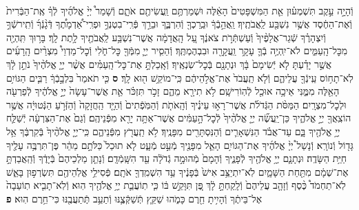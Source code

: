 \documentclass[twoside, openany, parskip=half, 11pt]{book}
\begin{document}
\begin{footnotesize}
\begin{multicols}{2}
\\
וְֿהָיָ֣ה עֵ֣קֶב תִּשְׁמְע֗וּן אֵ֤ת הַמִּשְׁפָּטִים֙ הָאֵ֔לֶּה וּשְׁמַרְתֶּ֥ם וַֽעֲשִׂיתֶ֖ם אֹתָ֑ם וְֿשָׁמַר֩ יְיָ֨ אֱלֹהֶ֜יךָ לְֿךָ֗ אֶֽת־הַבְּֿרִית֙ וְֿאֶת־הַחֶ֔סֶד אֲשֶׁ֥ר נִשְׁבַּ֖ע לַֽאֲבֹתֶֽיךָ׃ וַֽאֲהֵ֣בְֿךָ֔ וּבֵֽרַכְךָ֖ וְֿהִרְבֶּ֑ךָ וּבֵרַ֣ךְ פְּֿרִֽי־בִטְנְךָ֣ וּפְרִֽי־אַ֠דְמָתֶ֠ךָ דְּֿגָ֨נְֿךָ֜ וְֿתִֽירשְֿׁךָ֣ וְֿיִצְהָרֶ֗ךָ שְֿׁגַר־אֲלָפֶ֨יךָ֙ וְֿעַשְׁתְּֿרֹ֣ת צֹאנֶ֔ךָ עַ֚ל הָֽאֲדָמָ֔ה אֲשֶׁר־נִשְׁבַּ֥ע לַֽאֲבֹתֶ֖יךָ לָ֥תֶת לָֽךְ׃ בָּר֥וּךְ תִּֽהְיֶ֖ה מִכׇּל־הָֽעַמִּ֑ים לֹא־יִֽהְיֶ֥ה בְֿךָ֛ עָקָ֥ר וַֽעֲקָרָ֖ה וּבִבְהֶמְתֶּֽךָ׃ וְֿהֵסִ֧יר יְיָ֛ מִמְּֿךָ֖ כׇּל־חֹ֑לִי וְֿכׇל־מַדְוֵי֩ מִצְרַ֨יִם הָֽרָעִ֜ים אֲשֶׁ֣ר יָדַ֗עְתָּ לֹ֤א יְֿשִׂימָם֙ בָּ֔ךְ וּנְתָנָ֖ם בְּֿכׇל־שֽׂנְאֶֽיךָ׃ וְֿאָֽכַלְתָּ֣ אֶת־כׇּל־הָֽעַמִּ֗ים אֲשֶׁ֨ר יְיָ֤ אֱלֹהֶ֨יךָ֙ נֹתֵ֣ן לָ֔ךְ לֹֽא־תָח֥וֹס עֵֽינְֿךָ֖ עֲלֵיהֶ֑ם וְֿלֹ֤א תַֽעֲבֹד֙ אֶת־אֱלֹ֣הֵיהֶ֔ם כִּֽי־מוֹקֵ֥שׁ ה֖וּא לָֽךְ׃ \textbf{ס} כִּ֤י תֹאמַר֙ בִּלְבָ֣בְֿךָ֔ רַבִּ֛ים הַגּוֹיִ֥ם הָאֵ֖לֶּה מִמֶּ֑נִּי אֵיכָ֥ה אוּכַ֖ל לְֿהֽוֹרִישָֽׁם׃ לֹ֥א תִירָ֖א מֵהֶ֑ם זָכֹ֣ר תִּזְכֹּ֗ר אֵ֤ת אֲשֶׁר־עָשָׂה֙ יְיָ֣ אֱלֹהֶ֔יךָ לְֿפַרְעֹ֖ה וּלְכׇל־מִצְרָֽיִם׃ הַמַּסֹּ֨ת הַגְּֿדֹלֹ֜ת אֲשֶׁר־רָא֣וּ עֵינֶ֗יךָ וְֿהָֽאֹתֹ֤ת וְֿהַמֹּֽפְֿתִים֙ וְֿהַיָּ֤ד הַֽחֲזָקָה֙ וְֿהַזְּֿרֹ֣עַ הַנְּֿטוּיָ֔ה אֲשֶׁ֥ר הוֹצִֽאֲךָ֖ יְיָ֣ אֱלֹהֶ֑יךָ כֵּן־יַֽעֲשֶׂ֞ה יְיָ֤ אֱלֹהֶ֨יךָ֙ לְֿכׇל־הָ֣עַמִּ֔ים אֲשֶׁר־אַתָּ֥ה יָרֵ֖א מִפְּֿנֵיהֶֽם׃ וְֿגַם֙ אֶת־הַצִּרְעָ֔ה יְֿשַׁלַּ֛ח יְיָ֥ אֱלֹהֶ֖יךָ בָּ֑ם עַד־אֲבֹ֗ד הַנִּשְׁאָרִ֛ים וְֿהַנִּסְתָּרִ֖ים מִפָּנֶֽיךָ׃ לֹ֥א תַֽעֲרֹ֖ץ מִפְּֿנֵיהֶ֑ם כִּֽי־יְיָ֤ אֱלֹהֶ֨יךָ֙ בְּֿקִרְבֶּ֔ךָ אֵ֥ל גָּד֖וֹל וְֿנוֹרָֽא׃  וְֿנָשַׁל֩ יְיָ֨ אֱלֹהֶ֜יךָ אֶת־הַגּוֹיִ֥ם הָאֵ֛ל מִפָּנֶ֖יךָ מְֿעַ֣ט מְֿעָ֑ט לֹ֤א תוּכַל֙ כַּלֹּתָ֣ם מַהֵ֔ר פֶּן־תִּרְבֶּ֥ה עָלֶ֖יךָ חַיַּ֥ת הַשָּׂדֶֽה׃ וּנְתָנָ֛ם יְיָ֥ אֱלֹהֶ֖יךָ לְֿפָנֶ֑יךָ וְֿהָמָם֙ מְֿהוּמָ֣ה גְֿדֹלָ֔ה עַ֖ד הִשָּֽׁמְֿדָֽם׃ וְֿנָתַ֤ן מַלְכֵיהֶם֙ בְּֿיָדֶ֔ךָ וְֿהַֽאֲבַדְתָּ֣ אֶת־שְׁמָ֔ם מִתַּ֖חַת הַשָּׁמָ֑יִם לֹֽא־יִתְיַצֵּ֥ב אִישׁ֙ בְּֿפָנֶ֔יךָ עַ֥ד הִשְׁמִֽדְךָ֖ אֹתָֽם׃ פְּֿסִילֵ֥י אֱלֹֽהֵיהֶ֖ם תִּשְׂרְפ֣וּן בָּאֵ֑שׁ לֹֽא־תַחְמֹד֩ כֶּ֨סֶף וְֿזָהָ֤ב עֲלֵיהֶם֙ וְֿלָֽקַחְתָּ֣ לָ֔ךְ פֶּ֚ן תִּוָּקֵ֣שׁ בּ֔וֹ כִּ֧י תֽוֹעֲבַ֛ת יְיָ֥ אֱלֹהֶ֖יךָ הֽוּא׃ וְֿלֹֽא־תָבִ֤יא תֽוֹעֵבָה֙ אֶל־בֵּיתֶ֔ךָ וְֿהָיִ֥יתָ חֵ֖רֶם כָּמֹ֑הוּ שַׁקֵּ֧ץ תְּֿשַׁקְּֿצֶ֛נּוּ וְֿתַעֵ֥ב תְּֽֿתַעֲבֶ֖נּוּ כִּי־חֵ֥רֶם הֽוּא׃ \textbf{פ}

\end{multicols}
\end{footnotesize}
\end{document}
